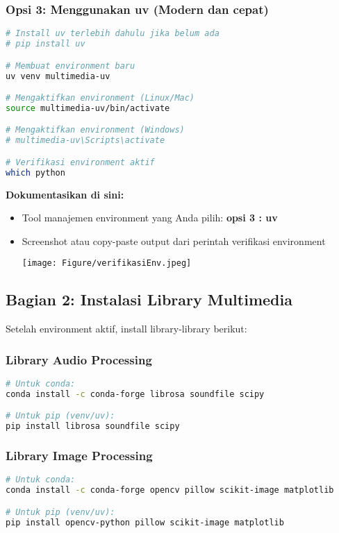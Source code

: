 \documentclass[11pt,a4paper]{article}
\begin{document}
\subsubsection{Opsi 3: Menggunakan uv (Modern dan cepat)}
\begin{lstlisting}[language=bash, caption=Membuat environment dengan uv]
# Install uv terlebih dahulu jika belum ada
# pip install uv

# Membuat environment baru
uv venv multimedia-uv

# Mengaktifkan environment (Linux/Mac)
source multimedia-uv/bin/activate

# Mengaktifkan environment (Windows)
# multimedia-uv\Scripts\activate

# Verifikasi environment aktif
which python
\end{lstlisting}

\textbf{Dokumentasikan di sini:}
\begin{itemize}
    \item Tool manajemen environment yang Anda pilih: \textbf{opsi 3 : uv}
    \item Screenshot atau copy-paste output dari perintah verifikasi environment
    \begin{center}
        \texttt{[image: Figure/verifikasiEnv.jpeg]}
        \vspace{0.1cm}
    \end{center}
\end{itemize}

\subsection{Bagian 2: Instalasi Library Multimedia}
Setelah environment aktif, install library-library berikut:

\subsubsection{Library Audio Processing}
\begin{lstlisting}[language=bash, caption=Instalasi library audio]
# Untuk conda:
conda install -c conda-forge librosa soundfile scipy

# Untuk pip (venv/uv):
pip install librosa soundfile scipy
\end{lstlisting}

\subsubsection{Library Image Processing}
\begin{lstlisting}[language=bash, caption=Instalasi library image]
# Untuk conda:
conda install -c conda-forge opencv pillow scikit-image matplotlib

# Untuk pip (venv/uv):
pip install opencv-python pillow scikit-image matplotlib
\end{lstlisting}
\end{document}
